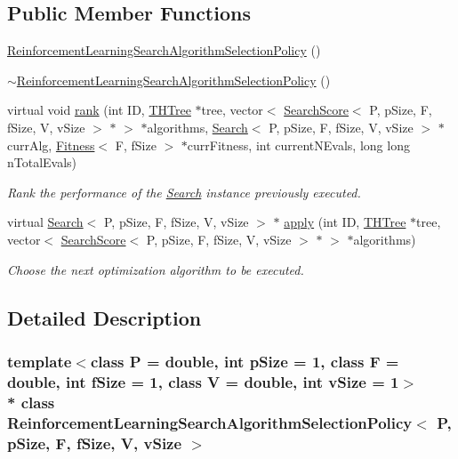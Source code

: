\subsection*{Public Member Functions}
\begin{DoxyCompactItemize}
\item 
\hyperlink{classReinforcementLearningSearchAlgorithmSelectionPolicy_a2749d93ae5cbefdfc9aedca07bfe51ce}{Reinforcement\+Learning\+Search\+Algorithm\+Selection\+Policy} ()
\item 
\hyperlink{classReinforcementLearningSearchAlgorithmSelectionPolicy_a391b7a37c4aa59b58e344d1452dffae1}{$\sim$\+Reinforcement\+Learning\+Search\+Algorithm\+Selection\+Policy} ()
\item 
virtual void \hyperlink{classReinforcementLearningSearchAlgorithmSelectionPolicy_a90a40b83202cab6aee7c547d51f40105}{rank} (int ID, \hyperlink{classTHTree}{T\+H\+Tree} $\ast$tree, vector$<$ \hyperlink{classSearchScore}{Search\+Score}$<$ P, p\+Size, F, f\+Size, V, v\+Size $>$ $\ast$ $>$ $\ast$algorithms, \hyperlink{classSearch}{Search}$<$ P, p\+Size, F, f\+Size, V, v\+Size $>$ $\ast$curr\+Alg, \hyperlink{structFitness}{Fitness}$<$ F, f\+Size $>$ $\ast$curr\+Fitness, int current\+N\+Evals, long long n\+Total\+Evals)
\begin{DoxyCompactList}\small\item\em Rank the performance of the \hyperlink{classSearch}{Search} instance previously executed. \end{DoxyCompactList}\item 
virtual \hyperlink{classSearch}{Search}$<$ P, p\+Size, F, f\+Size, V, v\+Size $>$ $\ast$ \hyperlink{classReinforcementLearningSearchAlgorithmSelectionPolicy_a4bd477b9e70030b13bc214cec3fa71d1}{apply} (int ID, \hyperlink{classTHTree}{T\+H\+Tree} $\ast$tree, vector$<$ \hyperlink{classSearchScore}{Search\+Score}$<$ P, p\+Size, F, f\+Size, V, v\+Size $>$ $\ast$ $>$ $\ast$algorithms)
\begin{DoxyCompactList}\small\item\em Choose the next optimization algorithm to be executed. \end{DoxyCompactList}\end{DoxyCompactItemize}


\subsection{Detailed Description}
\subsubsection*{template$<$class P = double, int p\+Size = 1, class F = double, int f\+Size = 1, class V = double, int v\+Size = 1$>$\\*
class Reinforcement\+Learning\+Search\+Algorithm\+Selection\+Policy$<$ P, p\+Size, F, f\+Size, V, v\+Size $>$}

